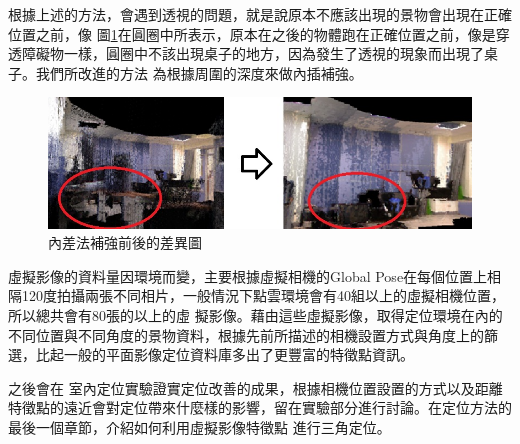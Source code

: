 	根據上述的方法，會遇到透視的問題，就是說原本不應該出現的景物會出現在正確位置之前，像
	圖\ref{fig:interpolation}在圓圈中所表示，原本在之後的物體跑在正確位置之前，像是穿透障礙物一樣，圓圈中不該出現桌子的地方，因為發生了透視的現象而出現了桌子。我們所改進的方法
	為根據周圍的深度來做內插補強。
	
	\begin{figure}
	\begin{center}
	  \includegraphics[width=1.0\textwidth]{figures/Depth_Interpolation.jpg}
	  \caption{內差法補強前後的差異圖}
	  \label{fig:interpolation}
	\end{center}
	\end{figure}	
	
	虛擬影像的資料量因環境而變，主要根據虛擬相機的Global Pose在每個位置上相隔120度拍攝兩張不同相片，一般情況下點雲環境會有40組以上的虛擬相機位置，所以總共會有80張的以上的虛
	擬影像。藉由這些虛擬影像，取得定位環境在內的不同位置與不同角度的景物資料，根據先前所描述的相機設置方式與角度上的篩選，比起一般的平面影像定位資料庫多出了更豐富的特徵點資訊。
	
	之後會在
	室內定位實驗證實定位改善的成果，根據相機位置設置的方式以及距離特徵點的遠近會對定位帶來什麼樣的影響，留在實驗部分進行討論。在定位方法的最後一個章節，介紹如何利用虛擬影像特徵點
	進行三角定位。

